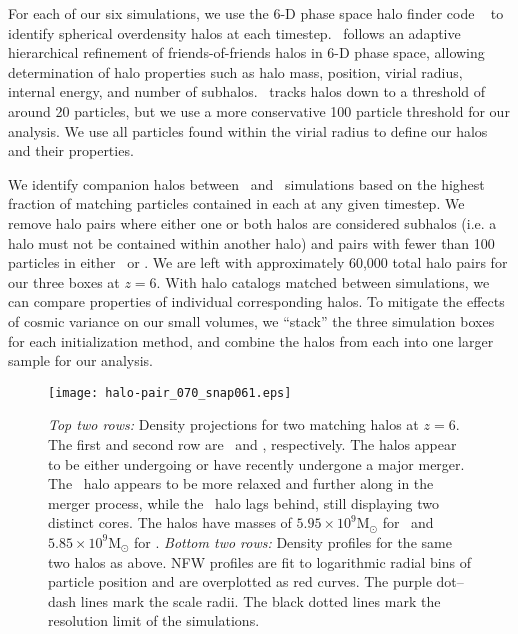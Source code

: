 

For each of our six simulations, we use the 6-D phase space halo finder code \rockstar\ \citep{2013ApJ...762..109B} to identify spherical overdensity halos at each timestep.  \rockstar\ follows an adaptive hierarchical refinement of friends-of-friends halos in 6-D phase space, allowing determination of halo properties such as halo mass, position, virial radius, internal energy, and number of subhalos.  \rockstar\ tracks halos down to a threshold of around 20 particles, but we use a more conservative 100 particle threshold for our analysis.  We use all particles found within the virial radius to define our halos and their properties.






We identify companion halos between \lpt\ and \za\ simulations based on the highest fraction of matching particles contained in each at any given timestep.  We remove halo pairs where either one or both halos are considered subhalos (i.e. a halo must not be contained within another halo) and pairs with fewer than 100 particles in either \lpt\ or \za.  We are left with approximately 60,000 total halo pairs for our three boxes at $z = 6$.  With halo catalogs matched between simulations, we can compare properties of individual corresponding halos.  To mitigate the effects of cosmic variance on our small volumes, we ``stack'' the three simulation boxes for each initialization method, and combine the halos from each into one larger sample for our analysis.






\begin{figure}[tp]
    \centering
    \texttt{[image: halo-pair\_070\_snap061.eps]}
	\caption[Comparison of matched \lpt\ and \za\ halos]{\footnotesize \textit{Top two rows:}  Density projections for two matching halos at $z = 6$.  The first and second row are \lpt\ and \za, respectively.  The halos appear to be either undergoing or have recently undergone a major merger.  The \lpt\ halo appears to be more relaxed and further along in the merger process, while the \za\ halo lags behind, still displaying two distinct cores.  The halos have masses of $5.95 \times 10^{9} \textrm{M}_{\odot}$ for \lpt\ and $5.85 \times 10^{9} \textrm{M}_{\odot}$ for \za.  \textit{Bottom two rows:}  Density profiles for the same two halos as above.  NFW profiles are fit to logarithmic radial bins of particle position and are overplotted as red curves.  The purple dot--dash lines mark the scale radii.  The black dotted lines mark the resolution limit of the simulations.}
    \label{fig:halo-pair}
\end{figure}

